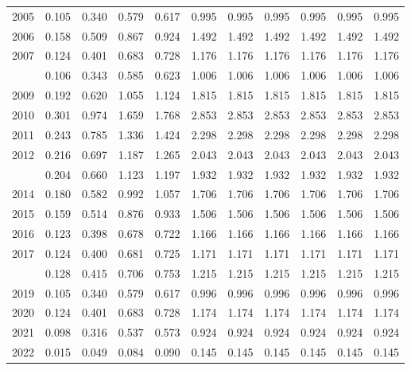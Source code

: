 \documentclass[
]{article}
\begin{document}
\begin{longtable}[t]{lrrrrrrrrrr}
2005 & 0.105 & 0.340 & 0.579 & 0.617 & 0.995 & 0.995 & 0.995 & 0.995 & 0.995 & 0.995\\
2006 & 0.158 & 0.509 & 0.867 & 0.924 & 1.492 & 1.492 & 1.492 & 1.492 & 1.492 & 1.492\\
2007 & 0.124 & 0.401 & 0.683 & 0.728 & 1.176 & 1.176 & 1.176 & 1.176 & 1.176 & 1.176\\
\addlinespace
2008 & 0.106 & 0.343 & 0.585 & 0.623 & 1.006 & 1.006 & 1.006 & 1.006 & 1.006 & 1.006\\
2009 & 0.192 & 0.620 & 1.055 & 1.124 & 1.815 & 1.815 & 1.815 & 1.815 & 1.815 & 1.815\\
2010 & 0.301 & 0.974 & 1.659 & 1.768 & 2.853 & 2.853 & 2.853 & 2.853 & 2.853 & 2.853\\
2011 & 0.243 & 0.785 & 1.336 & 1.424 & 2.298 & 2.298 & 2.298 & 2.298 & 2.298 & 2.298\\
2012 & 0.216 & 0.697 & 1.187 & 1.265 & 2.043 & 2.043 & 2.043 & 2.043 & 2.043 & 2.043\\
\addlinespace
2013 & 0.204 & 0.660 & 1.123 & 1.197 & 1.932 & 1.932 & 1.932 & 1.932 & 1.932 & 1.932\\
2014 & 0.180 & 0.582 & 0.992 & 1.057 & 1.706 & 1.706 & 1.706 & 1.706 & 1.706 & 1.706\\
2015 & 0.159 & 0.514 & 0.876 & 0.933 & 1.506 & 1.506 & 1.506 & 1.506 & 1.506 & 1.506\\
2016 & 0.123 & 0.398 & 0.678 & 0.722 & 1.166 & 1.166 & 1.166 & 1.166 & 1.166 & 1.166\\
2017 & 0.124 & 0.400 & 0.681 & 0.725 & 1.171 & 1.171 & 1.171 & 1.171 & 1.171 & 1.171\\
\addlinespace
2018 & 0.128 & 0.415 & 0.706 & 0.753 & 1.215 & 1.215 & 1.215 & 1.215 & 1.215 & 1.215\\
2019 & 0.105 & 0.340 & 0.579 & 0.617 & 0.996 & 0.996 & 0.996 & 0.996 & 0.996 & 0.996\\
2020 & 0.124 & 0.401 & 0.683 & 0.728 & 1.174 & 1.174 & 1.174 & 1.174 & 1.174 & 1.174\\
2021 & 0.098 & 0.316 & 0.537 & 0.573 & 0.924 & 0.924 & 0.924 & 0.924 & 0.924 & 0.924\\
2022 & 0.015 & 0.049 & 0.084 & 0.090 & 0.145 & 0.145 & 0.145 & 0.145 & 0.145 & 0.145\\*
\end{longtable}
\end{document}
